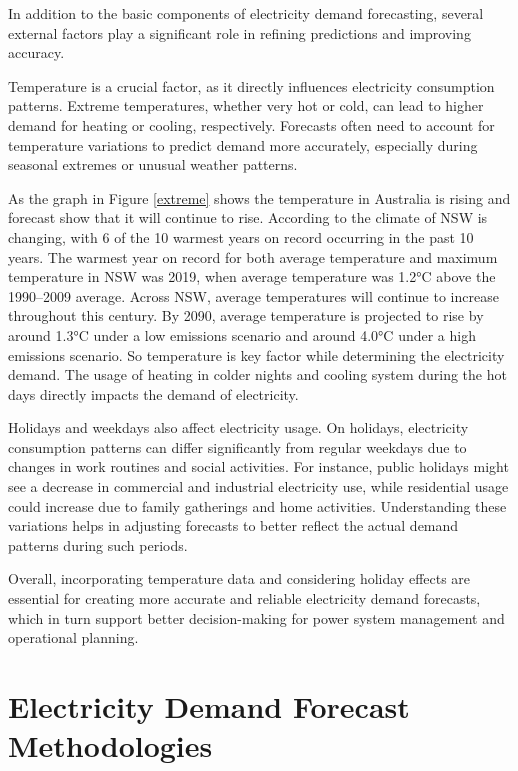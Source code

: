 \documentclass[mstat,12pt]{unswthesis}
\begin{document}
In addition to the basic components of electricity demand forecasting,
several external factors play a significant role in refining predictions
and improving accuracy.

Temperature is a crucial factor, as it directly influences electricity
consumption patterns. Extreme temperatures, whether very hot or cold,
can lead to higher demand for heating or cooling, respectively.
Forecasts often need to account for temperature variations to predict
demand more accurately, especially during seasonal extremes or unusual
weather patterns.

As the graph in Figure \ref{extreme} shows the temperature in Australia
is rising and forecast show that it will continue to rise. According to
\cite{nswAdaptNSW} the climate of NSW is changing, with 6 of the 10
warmest years on record occurring in the past 10 years. The warmest year
on record for both average temperature and maximum temperature in NSW
was 2019, when average temperature was 1.2°C above the 1990--2009
average. Across NSW, average temperatures will continue to increase
throughout this century. By 2090, average temperature is projected to
rise by around 1.3°C under a low emissions scenario and around 4.0°C
under a high emissions scenario. So temperature is key factor while
determining the electricity demand. The usage of heating in colder
nights and cooling system during the hot days directly impacts the
demand of electricity.

Holidays and weekdays also affect electricity usage. On holidays,
electricity consumption patterns can differ significantly from regular
weekdays due to changes in work routines and social activities. For
instance, public holidays might see a decrease in commercial and
industrial electricity use, while residential usage could increase due
to family gatherings and home activities. Understanding these variations
helps in adjusting forecasts to better reflect the actual demand
patterns during such periods.

Overall, incorporating temperature data and considering holiday effects
are essential for creating more accurate and reliable electricity demand
forecasts, which in turn support better decision-making for power system
management and operational planning.

\section{Electricity Demand Forecast
Methodologies}\label{electricity-demand-forecast-methodologies}
\end{document}
